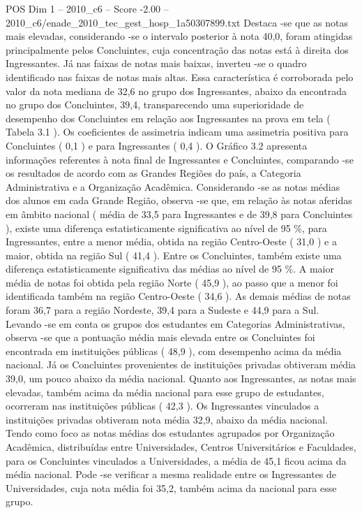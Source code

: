 \begin{textsample}{POS Dim 1 – 2010\_c6 – Score -2.00 – 2010\_c6/enade\_2010\_tec\_gest\_hosp\_1a50307899.txt}
Destaca -se que as notas mais elevadas, considerando -se o intervalo posterior à nota 40,0, foram atingidas principalmente pelos Concluintes, cuja concentração das notas está à direita dos Ingressantes.
Já nas faixas de notas mais baixas, inverteu -se o quadro identificado nas faixas de notas mais altas.
Essa característica é corroborada pelo valor da nota mediana de 32,6 no grupo dos Ingressantes, abaixo da encontrada no grupo dos Concluintes, 39,4, transparecendo uma superioridade de desempenho dos Concluintes em relação aos Ingressantes na prova em tela ( Tabela 3.1 ).
Os coeficientes de assimetria indicam uma assimetria positiva para Concluintes ( 0,1 ) e para Ingressantes ( 0,4 ).
O Gráfico 3.2 apresenta informações referentes à nota final de Ingressantes e Concluintes, comparando -se os resultados de acordo com as Grandes Regiões do país, a Categoria Administrativa e a Organização Acadêmica.
Considerando -se as notas médias dos alunos em cada Grande Região, observa -se que, em relação às notas aferidas em âmbito nacional ( média de 33,5 para Ingressantes e de 39,8 para Concluintes ), existe uma diferença estatisticamente significativa ao nível de 95 \%, para Ingressantes, entre a menor média, obtida na região Centro-Oeste ( 31,0 ) e a maior, obtida na região Sul ( 41,4 ).
Entre os Concluintes, também existe uma diferença estatisticamente significativa das médias ao nível de 95 \%.
A maior média de notas foi obtida pela região Norte ( 45,9 ), ao passo que a menor foi identificada também na região Centro-Oeste ( 34,6 ).
As demais médias de notas foram 36,7 para a região Nordeste, 39,4 para a Sudeste e 44,9 para a Sul.
Levando -se em conta os grupos dos estudantes em Categorias Administrativas, observa -se que a pontuação média mais elevada entre os Concluintes foi encontrada em instituições públicas ( 48,9 ), com desempenho acima da média nacional.
Já os Concluintes provenientes de instituições privadas obtiveram média 39,0, um pouco abaixo da média nacional.
Quanto aos Ingressantes, as notas mais elevadas, também acima da média nacional para esse grupo de estudantes, ocorreram nas instituições públicas ( 42,3 ).
Os Ingressantes vinculados a instituições privadas obtiveram nota média 32,9, abaixo da média nacional.
Tendo como foco as notas médias dos estudantes agrupados por Organização Acadêmica, distribuídas entre Universidades, Centros Universitários e Faculdades, para os Concluintes vinculados a Universidades, a média de 45,1 ficou acima da média nacional.
Pode -se verificar a mesma realidade entre os Ingressantes de Universidades, cuja nota média foi 35,2, também acima da nacional para esse grupo.

\end{textsample}
